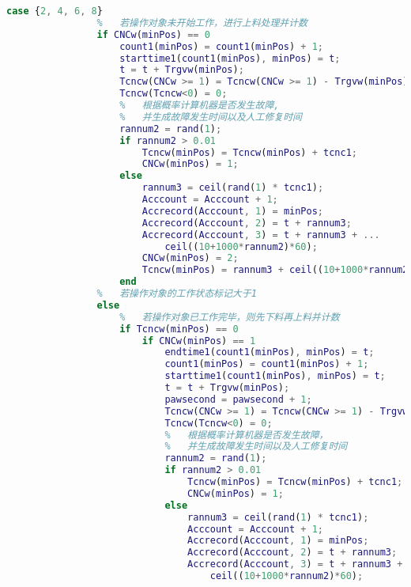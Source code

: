 \documentclass[no-math,withoutpreface,bwprint]{cumcmthesis} %
\numberwithin{equation}{section}
\numberwithin{figure}{section}
\numberwithin{table}{section}
\begin{document}
\begin{lstlisting}[language=matlab]
            case {2, 4, 6, 8}
                %   若操作对象未开始工作，进行上料处理并计数
                if CNCw(minPos) == 0
                    count1(minPos) = count1(minPos) + 1;
                    starttime1(count1(minPos), minPos) = t;
                    t = t + Trgvw(minPos);
                    Tcncw(CNCw >= 1) = Tcncw(CNCw >= 1) - Trgvw(minPos);
                    Tcncw(Tcncw<0) = 0;
                    %   根据概率计算机器是否发生故障,
                    %   并生成故障发生时间以及人工修复时间
                    rannum2 = rand(1);
                    if rannum2 > 0.01
                        Tcncw(minPos) = Tcncw(minPos) + tcnc1;
                        CNCw(minPos) = 1;
                    else
                        rannum3 = ceil(rand(1) * tcnc1);
                        Acccount = Acccount + 1;
                        Accrecord(Acccount, 1) = minPos;
                        Accrecord(Acccount, 2) = t + rannum3;
                        Accrecord(Acccount, 3) = t + rannum3 + ...
                            ceil((10+1000*rannum2)*60);
                        CNCw(minPos) = 2;
                        Tcncw(minPos) = rannum3 + ceil((10+1000*rannum2)*60);
                    end
                %   若操作对象的工作状态标记大于1
                else
                    %   若操作对象已工作完毕，则先下料再上料并计数
                    if Tcncw(minPos) == 0
                        if CNCw(minPos) == 1
                            endtime1(count1(minPos), minPos) = t;
                            count1(minPos) = count1(minPos) + 1;
                            starttime1(count1(minPos), minPos) = t;
                            t = t + Trgvw(minPos);
                            pawsecond = pawsecond + 1;
                            Tcncw(CNCw >= 1) = Tcncw(CNCw >= 1) - Trgvw(minPos);
                            Tcncw(Tcncw<0) = 0;
                            %   根据概率计算机器是否发生故障，
                            %   并生成故障发生时间以及人工修复时间
                            rannum2 = rand(1);
                            if rannum2 > 0.01
                                Tcncw(minPos) = Tcncw(minPos) + tcnc1;
                                CNCw(minPos) = 1;
                            else
                                rannum3 = ceil(rand(1) * tcnc1);
                                Acccount = Acccount + 1;
                                Accrecord(Acccount, 1) = minPos;
                                Accrecord(Acccount, 2) = t + rannum3;
                                Accrecord(Acccount, 3) = t + rannum3 + ...
                                    ceil((10+1000*rannum2)*60);

\end{lstlisting}
\end{document}
